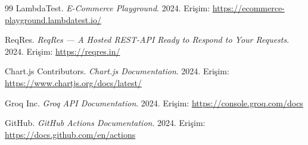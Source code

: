 \begin{thebibliography}{99}
LambdaTest.
\textit{E-Commerce Playground}.
2024.
Erişim: \url{https://ecommerce-playground.lambdatest.io/}

ReqRes.
\textit{ReqRes --- A Hosted REST-API Ready to Respond to Your Requests}.
2024.
Erişim: \url{https://reqres.in/}

Chart.js Contributors.
\textit{Chart.js Documentation}.
2024.
Erişim: \url{https://www.chartjs.org/docs/latest/}

Groq Inc.
\textit{Groq API Documentation}.
2024.
Erişim: \url{https://console.groq.com/docs}

GitHub.
\textit{GitHub Actions Documentation}.
2024.
Erişim: \url{https://docs.github.com/en/actions}

\end{thebibliography}
